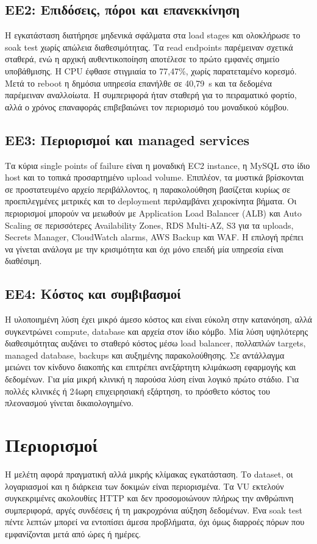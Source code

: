 \subsection*{ΕΕ2: Επιδόσεις, πόροι και επανεκκίνηση}
Η εγκατάσταση διατήρησε μηδενικά σφάλματα στα load stages και ολοκλήρωσε το
soak test χωρίς απώλεια διαθεσιμότητας. Τα read endpoints παρέμειναν σχετικά
σταθερά, ενώ η αρχική αυθεντικοποίηση αποτέλεσε το πρώτο εμφανές σημείο
υποβάθμισης. Η CPU έφθασε στιγμιαία το 77,47\%, χωρίς παρατεταμένο κορεσμό.
Μετά το reboot η δημόσια υπηρεσία επανήλθε σε 40,79~s και τα δεδομένα
παρέμειναν αναλλοίωτα. Η συμπεριφορά ήταν σταθερή για το πειραματικό φορτίο,
αλλά ο χρόνος επαναφοράς επιβεβαιώνει τον περιορισμό του μοναδικού κόμβου.

\subsection*{ΕΕ3: Περιορισμοί και managed services}
Τα κύρια single points of failure είναι η μοναδική EC2 instance, η MySQL
στο ίδιο host και το τοπικά προσαρτημένο upload volume. Επιπλέον, τα μυστικά
βρίσκονται σε προστατευμένο αρχείο περιβάλλοντος, η παρακολούθηση βασίζεται
κυρίως σε προεπιλεγμένες μετρικές και το deployment περιλαμβάνει χειροκίνητα
βήματα. Οι περιορισμοί μπορούν να μειωθούν με Application Load Balancer
(ALB) και Auto Scaling σε περισσότερες Availability Zones, RDS Multi-AZ, S3 για τα
uploads, Secrets Manager, CloudWatch alarms, AWS Backup και WAF. Η επιλογή
πρέπει να γίνεται ανάλογα με την κρισιμότητα και όχι μόνο επειδή μία υπηρεσία
είναι διαθέσιμη.

\subsection*{ΕΕ4: Κόστος και συμβιβασμοί}
Η υλοποιημένη λύση έχει μικρό άμεσο κόστος και είναι εύκολη στην κατανόηση,
αλλά συγκεντρώνει compute, database και αρχεία στον ίδιο κόμβο. Μία λύση
υψηλότερης διαθεσιμότητας αυξάνει το σταθερό κόστος μέσω load balancer,
πολλαπλών targets, managed database, backups και αυξημένης παρακολούθησης.
Σε αντάλλαγμα μειώνει τον κίνδυνο διακοπής και επιτρέπει ανεξάρτητη κλιμάκωση
εφαρμογής και δεδομένων. Για μία μικρή κλινική η παρούσα λύση είναι λογικό
πρώτο στάδιο. Για πολλές κλινικές ή 24ωρη επιχειρησιακή εξάρτηση, το πρόσθετο
κόστος του πλεονασμού γίνεται δικαιολογημένο.

\section{Περιορισμοί}
Η μελέτη αφορά πραγματική αλλά μικρής κλίμακας εγκατάσταση. Το dataset, οι
λογαριασμοί και η διάρκεια των δοκιμών είναι περιορισμένα. Τα VU εκτελούν
συγκεκριμένες ακολουθίες HTTP και δεν προσομοιώνουν πλήρως την ανθρώπινη
συμπεριφορά, αργές συνδέσεις ή τη μακροχρόνια αύξηση δεδομένων. Ένα soak test
πέντε λεπτών μπορεί να εντοπίσει άμεσα προβλήματα, όχι όμως διαρροές πόρων που
εμφανίζονται μετά από ώρες ή ημέρες.

